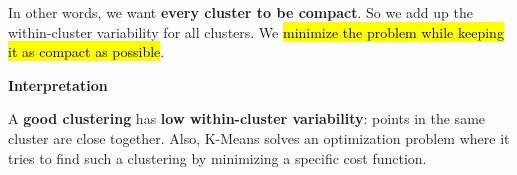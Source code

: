 \highspace
In other words, we want \textbf{every cluster to be compact}. So we add up the within-cluster variability for all clusters. We \hl{minimize the problem while keeping it as compact as possible}.

\highspace
\begin{flushleft}
    \textcolor{Green3}{ \textbf{Interpretation}}
\end{flushleft}
A \textbf{good clustering} has \textbf{low within-cluster variability}: points in the same cluster are close together. Also, K-Means solves an optimization problem where it tries to find such a clustering by minimizing a specific cost function.